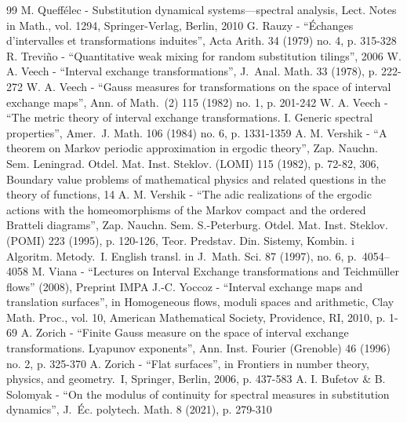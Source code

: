 \documentclass[10pt]{amsart}
\theoremstyle{plain}
\theoremstyle{definition}
\begin{document}
\begin{thebibliography}{99}
 M. Queffélec - Substitution dynamical systems—spectral analysis, Lect. Notes in Math., vol. 1294, Springer-Verlag, Berlin, 2010
 G. Rauzy - “Échanges d’intervalles et transformations induites”, Acta Arith. 34 (1979) no. 4, p. 315-328
 R. Treviño - “Quantitative weak mixing for random substitution tilings”, 2006
 W. A. Veech - “Interval exchange transformations”, J. Anal. Math. 33 (1978), p. 222-272
 W. A. Veech - “Gauss measures for transformations on the space of interval exchange maps”, Ann. of Math. (2) 115 (1982) no. 1, p. 201-242
 W. A. Veech - “The metric theory of interval exchange transformations. I. Generic spectral properties”, Amer. J. Math. 106 (1984) no. 6, p. 1331-1359
 A. M. Vershik - “A theorem on Markov periodic approximation in ergodic theory”, Zap. Nauchn. Sem. Leningrad. Otdel. Mat. Inst. Steklov. (LOMI) 115 (1982), p. 72-82, 306, Boundary value problems of mathematical physics and related questions in the theory of functions, 14
 A. M. Vershik - “The adic realizations of the ergodic actions with the homeomorphisms of the Markov compact and the ordered Bratteli diagrams”, Zap. Nauchn. Sem. S.-Peterburg. Otdel. Mat. Inst. Steklov. (POMI) 223 (1995), p. 120-126, Teor. Predstav. Din. Sistemy, Kombin. i Algoritm. Metody. I. English transl. in J. Math. Sci. 87 (1997), no. 6, p. 4054–4058
 M. Viana - “Lectures on Interval Exchange transformations and Teichmüller flows” (2008), Preprint IMPA
 J.-C. Yoccoz - “Interval exchange maps and translation surfaces”, in Homogeneous flows, moduli spaces and arithmetic, Clay Math. Proc., vol. 10, American Mathematical Society, Providence, RI, 2010, p. 1-69
 A. Zorich - “Finite Gauss measure on the space of interval exchange transformations. Lyapunov exponents”, Ann. Inst. Fourier (Grenoble) 46 (1996) no. 2, p. 325-370
 A. Zorich - “Flat surfaces”, in Frontiers in number theory, physics, and geometry. I, Springer, Berlin, 2006, p. 437-583
 A. I. Bufetov \& B. Solomyak - “On the modulus of continuity for spectral measures in substitution dynamics”, J. Éc. polytech. Math. 8 (2021), p. 279-310
\end{thebibliography}
\end{document}
